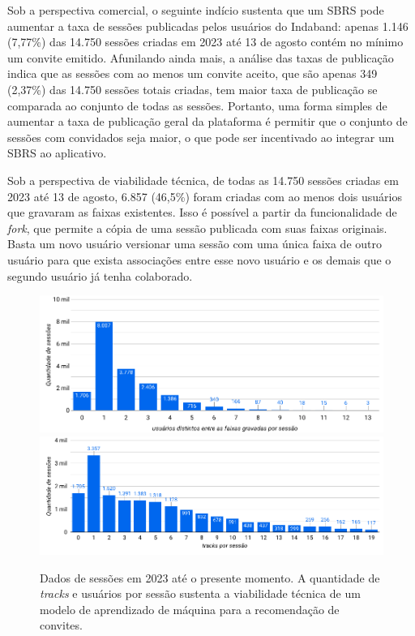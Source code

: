 Sob a perspectiva comercial, o seguinte indício sustenta que um SBRS pode
aumentar a taxa de sessões publicadas pelos usuários do Indaband: apenas 1.146
(7,77\%) das 14.750 sessões criadas em 2023 até 13 de agosto contém no mínimo um
convite emitido. Afunilando ainda mais, a análise das taxas de publicação indica
que as sessões com ao menos um convite aceito, que são apenas 349 (2,37\%) das
14.750 sessões totais criadas, tem maior taxa de publicação se comparada ao
conjunto de todas as sessões. Portanto, uma forma simples de aumentar a taxa de
publicação geral da plataforma é permitir que o conjunto de sessões com
convidados seja maior, o que pode ser incentivado ao integrar um SBRS ao
aplicativo.

Sob a perspectiva de viabilidade técnica, de todas as 14.750 sessões criadas
em 2023 até 13 de agosto, 6.857 (46,5\%) foram criadas com ao menos dois
usuários que gravaram as faixas existentes. Isso é possível a partir da
funcionalidade de \textit{fork}, que permite a cópia de uma sessão publicada
com suas faixas originais. Basta um novo usuário versionar uma sessão com uma
única faixa de outro usuário para que exista associações entre esse novo
usuário e os demais que o segundo usuário já tenha colaborado.

\vspace{0.2cm}
\begin{figure}[H]
      \centering
      \includegraphics[width=1\textwidth]{chapters/chap01/images/plots/users.png}\vfill
      \includegraphics[width=1\textwidth]{chapters/chap01/images/plots/tracks.png}
      \caption{Dados de sessões em 2023 até o presente momento. A quantidade de \textit{tracks}
       e usuários por sessão sustenta a viabilidade técnica de um modelo de
       aprendizado de máquina para a recomendação de convites.}
      \label{fig:combined}
  \end{figure}
\vspace{0.2cm}
